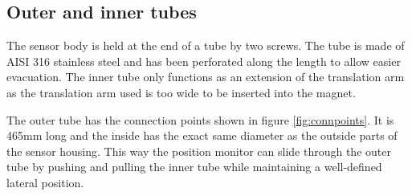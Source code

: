 \subsection{Outer and inner tubes}
The sensor body is held at the end of a tube by two screws. The tube is made of AISI 316 stainless steel and has been perforated along the length to allow easier evacuation. The inner tube only functions as an extension of the translation arm as the translation arm used is too wide to be inserted into the magnet.

The outer tube has the connection points shown in figure \ref{fig:connpoints}. It is 465mm long and the inside has the exact same diameter as the outside parts of the sensor housing. This way the position monitor can slide through the outer tube by pushing and pulling the inner tube while maintaining a well-defined lateral position.



